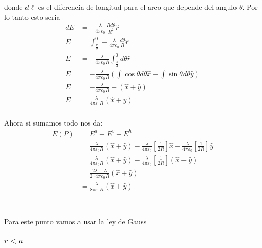 \documentclass{report}
\begin{document}
\begin{itemize}
		donde $d\ell$ es el diferencia de longitud para el arco que depende del angulo $\theta$. Por lo tanto esto seria
		\begin{align*}
			dE &= - \frac{\lambda}{4\pi\varepsilon_0} \frac{R d\theta}{R^2} \hat{r}\\
			E &= \int_{\frac{\pi}{2}}^0 - \frac{\lambda}{4\pi\varepsilon_0} \frac{d\theta}{R} \hat{r}\\
			E &= - \frac{\lambda}{4\pi\varepsilon_0 R} \int_{\frac{\pi}{2}}^0 d\theta \hat{r}\\
			E &= - \frac{\lambda}{4\pi\varepsilon_0 R} \left(\int \cos\theta d\theta  \hat{x} + \int \sin\theta d\theta \hat{y}\right)\\
			E &= - \frac{\lambda}{4\pi\varepsilon_0 R} - \left( \hat{x} + \hat{y}\right)\\
			E &= \frac{\lambda}{4\pi\varepsilon_0 R} \left( \hat{x} + \hat{y}\right)\\
		\end{align*}
\end{itemize}

Ahora si sumamos todo nos da:
\begin{align*}
	E(P) &= E^a + E^v + E^h\\
	&= \frac{\lambda}{4\pi\varepsilon_0 R} \left( \hat{x} + \hat{y}\right) - \frac{\lambda}{4\pi\varepsilon_0} \left[\frac{1}{2R}\right]\hat{x} - \frac{\lambda}{4\pi\varepsilon_0} \left[\frac{1}{2R}\right]\hat{y}\\
	&= \frac{\lambda}{4\pi\varepsilon_0 R} \left( \hat{x} + \hat{y}\right) - \frac{\lambda}{4\pi\varepsilon_0} \left[\frac{1}{2R}\right]\left(\hat{x} + \hat{y}\right)\\
	&= \frac{2\lambda - \lambda}{2\cdot4\pi\varepsilon_0 R} \left( \hat{x} + \hat{y}\right)\\
	&= \frac{\lambda}{8\pi\varepsilon_0 R} \left( \hat{x} + \hat{y}\right)\\
\end{align*}

\chapter{}

\section{}

Para este punto vamos a usar la ley de Gauss

\subsection{$r < a$}
\end{document}
